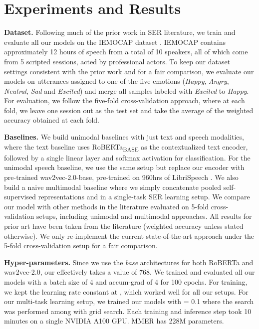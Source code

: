 \documentclass{INTERSPEECH2023}
\begin{document}
\section{Experiments and Results}
\label{sec:experiments}
{\noindent \textbf{Dataset.}} Following much of the prior work in SER literature, we train and evaluate all our models on the IEMOCAP dataset \cite{busso2008iemocap}. IEMOCAP contains approximately 12 hours of speech from a total of 10 speakers, all of which come from 5 scripted sessions, acted by professional actors. To keep our dataset settings consistent with the prior work and for a fair comparison, we evaluate our models on utterances assigned to one of the five emotions (\emph{Happy}, \emph{Angry}, \emph{Neutral}, \emph{Sad} and \emph{Excited}) and merge all samples labeled with \emph{Excited} to \emph{Happy}. For evaluation, we follow the five-fold cross-validation approach, where at each fold, we leave one session out as the test set and take the average of the weighted accuracy obtained at each fold.
\vspace{1mm}

{\noindent \textbf{Baselines.}} We build unimodal baselines with just text and speech modalities, where the text baseline uses RoBERTa\textsubscript{BASE} as the contextualized text encoder, followed by a single linear layer and softmax activation for classification. For the unimodal speech baseline, we use the same setup but replace our encoder with pre-trained wav2vec-2.0-base, pre-trained on 960hrs of LibriSpeech \cite{panayotov2015librispeech}. We also build a naive multimodal baseline where we simply concatenate pooled self-supervised representations  and  in a single-task SER learning setup. We compare our model with other methods in the literature evaluated on 5-fold cross-validation setups, including unimodal and multimodal approaches. All results for prior art have been taken from the literature (weighted accuracy unless stated otherwise). We only re-implement the current state-of-the-art approach \cite{cai2021speech} under the 5-fold cross-validation setup for a fair comparison.
\vspace{1mm}




{\noindent \textbf{Hyper-parameters.}} Since we use the \emph{base} architectures for both RoBERTa and wav2vec-2.0, our  effectively takes a value of 768. We trained and evaluated all our models with a batch size of 4 and accum-grad of 4 for 100 epochs. For training, we kept the learning rate constant at , which worked well for all our setups. For our multi-task learning setup, we trained our models with  = 0.1 where the search was performed among  with grid search. Each training and inference step took 10 minutes on a single NVIDIA A100 GPU. MMER has 228M parameters.
\vspace{1mm}
\end{document}
